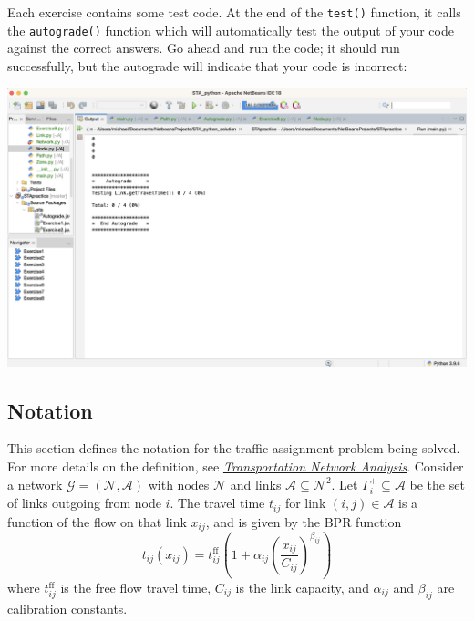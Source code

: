 \documentclass[11pt]{article}
\newcommand{\N}{\mathcal{N}}
\newcommand{\A}{\mathcal{A}}
\newcommand{\tff}{t^{\mathrm{ff}}_{ij}}
\begin{document}
Each exercise contains some test code. At the end of the \texttt{test()} function, it calls the \texttt{autograde()} function which will automatically test the output of your code against the correct answers. Go ahead and run the code; it should run successfully, but the autograde will indicate that your code is incorrect:

\begin{center}
	\includegraphics[width=\textwidth]{netbeans1a.png}
\end{center}








\subsection{Notation}

This section defines the notation for the traffic assignment problem being solved. 
For more details on the definition, see \href{https://sboyles.github.io/blubook.html}{\textit{Transportation Network Analysis}}. 
Consider a network $\mathcal{G}=(\N,\A)$ with nodes $\N$ and links $\A\subseteq \N^2$.  Let $\Gamma^+_i\subseteq\A$ be the set of links outgoing from node $i$. The travel time $t_{ij}$ for link $(i,j)\in\A$ is a function of the flow on that link $x_{ij}$, and is given by the BPR function
\begin{equation}
	t_{ij}(x_{ij}) = \tff \left(1+\alpha_{ij} \left(\frac{x_{ij}}{C_{ij}}\right)^{\beta_{ij}}\right) \label{bpr}
\end{equation}
where $\tff$ is the free flow travel time, $C_{ij}$ is the link capacity, and $\alpha_{ij}$ and $\beta_{ij}$ are calibration constants.
\end{document}
